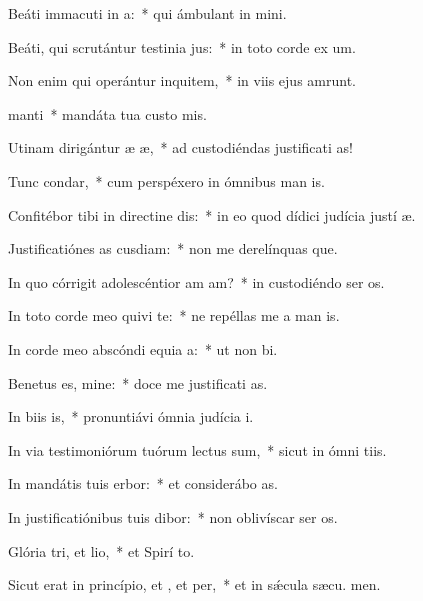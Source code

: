 \item Beáti immacuti in a:~* qui ámbulant in  mini.
\item Beáti, qui scrutántur testinia jus:~* in toto corde ex um.
\item Non enim qui operántur inquitem,~* in viis ejus amrunt.
\item {} manti~* mandáta tua custo mis.
\item Utinam dirigántur æ æ,~* ad custodiéndas justificati as!
\item Tunc  condar,~* cum perspéxero in ómnibus man is.
\item Confitébor tibi in directine dis:~* in eo quod dídici judícia justí æ.
\item Justificatiónes as cusdiam:~* non me derelínquas que.
\item In quo córrigit adolescéntior am am?~* in custodiéndo ser os.
\item In toto corde meo quivi te:~* ne repéllas me a man is.
\item In corde meo abscóndi equia a:~* ut non  bi.
\item Benetus es, mine:~* doce me justificati as.
\item In biis is,~* pronuntiávi ómnia judícia  i.
\item In via testimoniórum tuórum lectus sum,~* sicut in ómni tiis.
\item In mandátis tuis erbor:~* et considerábo  as.
\item In justificatiónibus tuis dibor:~* non oblivíscar ser os.
\item Glória tri, et lio,~* et Spirí to.
\item Sicut erat in princípio, et , et per,~* et in sǽcula sæcu. men.
